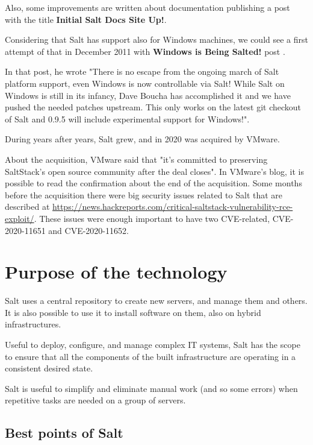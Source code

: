 \documentclass[12pt,a4paper,openright,twoside]{book}
\begin{document}
Also, some improvements are written about documentation publishing a post with the title \textbf{Initial Salt Docs Site Up!}\cite{saltPost}.


Considering that Salt has support also for Windows machines, we could see a first attempt of that in December 2011 with \textbf{Windows is Being Salted!} post \cite{saltPost2}.


In that post, he wrote "There is no escape from the ongoing march of Salt platform support, even Windows is now controllable via Salt! While Salt on Windows is still in its infancy, Dave Boucha has accomplished it and we have pushed the needed patches upstream. This only works on the latest git checkout of Salt and 0.9.5 will include experimental support for Windows!"\cite{saltPost2}.

During years after years, Salt grew, and in 2020 was acquired by VMware.

About the acquisition, VMware said that "it's committed to preserving SaltStack's open source community after the deal closes"\cite{saltAcq}.
In VMware's blog, it is possible to read the confirmation about the end of the acquisition\cite{saltAcqEnd}.
Some months before the acquisition there were big security issues related to Salt that are described at \url{https://news.hackreports.com/critical-saltstack-vulnerability-rce-exploit/}.
These issues were enough important to have two CVE-related, CVE-2020-11651 and CVE-2020-11652.

\section{Purpose of the technology}
Salt uses a central repository to create new servers, and manage them and others. It is also possible to use it to install software on them, also on hybrid infrastructures.


Useful to deploy, configure, and manage complex IT systems, Salt has the scope to ensure that all the components of the built infrastructure are operating in a consistent desired state.


Salt is useful to simplify and eliminate manual work (and so some errors) when repetitive tasks are needed on a group of servers.

\subsection{Best points of Salt}
\end{document}
